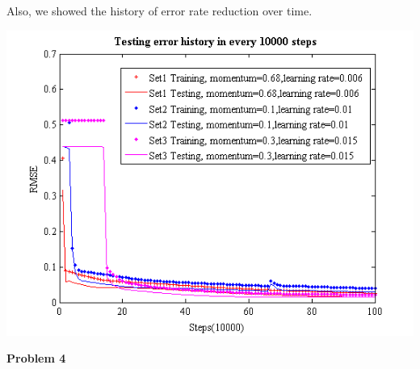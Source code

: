\documentclass[epsfig]{article}
\def\bpar{\vskip26pt}
\def\npar{\vskip13pt}
\begin{document}
Also, we showed the history of error rate reduction over time. 

	\centerline{\includegraphics[width=6.5in]{best_err.png} }


\clearpage

{\bf 
\npar
Problem 4
\bpar
}
\end{document}

